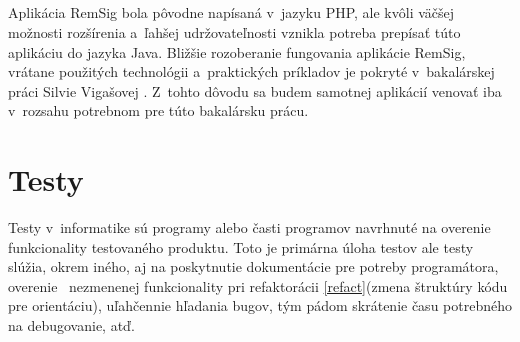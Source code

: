 \documentclass[
  digital, %
  table,   %
oneside,
  nolof,     %
  nolot,     %
]{fithesis3}
\begin{document}
\paragraph{}
Aplikácia RemSig bola pôvodne napísaná v~jazyku PHP, ale kvôli väčšej možnosti rozšírenia a~ľahšej udržovateľnosti \cite{javaVsPHP} vznikla potreba prepísať túto aplikáciu do jazyka Java.  Bližšie rozoberanie fungovania aplikácie RemSig, vrátane použitých technológii a~praktických príkladov je pokryté v~bakalárskej práci Silvie Vigašovej \cite{remsigSilvia}. Z~tohto dôvodu sa budem samotnej aplikácií venovať iba v~rozsahu potrebnom pre túto bakalársku prácu. 



\chapter{Testy}
Testy v~informatike sú programy alebo časti programov navrhnuté na overenie funkcionality testovaného produktu. Toto je primárna úloha testov ale testy slúžia, okrem iného, aj na poskytnutie dokumentácie pre potreby programátora, overenie \ nezmenenej funkcionality pri refaktorácii \ref{refact}(zmena štruktúry kódu pre orientáciu), uľahčennie hľadania bugov, tým pádom skrátenie času potrebného na debugovanie, atď.
\end{document}

